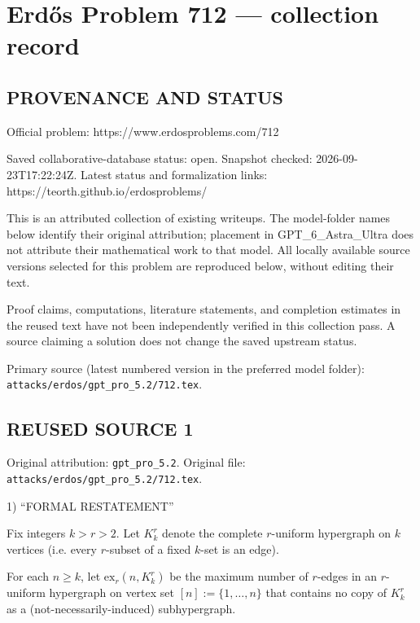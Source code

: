 \section*{Erd\H{o}s Problem 712 --- collection record}

\subsection*{PROVENANCE AND STATUS}
Official problem: https://www.erdosproblems.com/712

Saved collaborative-database status: open.
Snapshot checked: 2026-09-23T17:22:24Z.
Latest status and formalization links: https://teorth.github.io/erdosproblems/

This is an attributed collection of existing writeups. The model-folder names below identify their original attribution; placement in GPT\_6\_Astra\_Ultra does not attribute their mathematical work to that model. All locally available source versions selected for this problem are reproduced below, without editing their text.

Proof claims, computations, literature statements, and completion estimates in the reused text have not been independently verified in this collection pass. A source claiming a solution does not change the saved upstream status.

Primary source (latest numbered version in the preferred model folder): \texttt{attacks/erdos/gpt\_pro\_5.2/712.tex}.

\subsection*{REUSED SOURCE 1}
Original attribution: \texttt{gpt\_pro\_5.2}.
Original file: \texttt{attacks/erdos/gpt\_pro\_5.2/712.tex}.


1) “FORMAL RESTATEMENT”

Fix integers $k>r>2$. Let $K_k^r$ denote the complete $r$-uniform hypergraph on $k$ vertices (i.e. every $r$-subset of a fixed $k$-set is an edge).

For each $n\ge k$, let $\mathrm{ex}_r(n,K_k^r)$ be the maximum number of $r$-edges in an $r$-uniform hypergraph on vertex set $[n]:=\{1,\dots,n\}$ that contains no copy of $K_k^r$ as a (not-necessarily-induced) subhypergraph.

